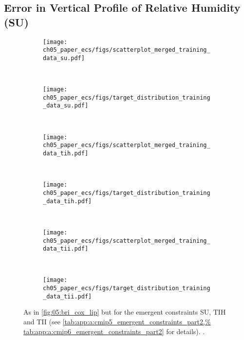 \subsection{Error in Vertical Profile of Relative Humidity (SU)}
\label{subsec:05:su}

\begin{figure}[!t]
  \centering
  \begin{subfigure}[b]{\SubfigureWidth{}}
    \texttt{[image: 
      ch05\_paper\_ecs/figs/scatterplot\_merged\_training\_data\_su.pdf]}
    \caption{}
    \label{fig:05:su_tih_tii:a}
  \end{subfigure}
  ~
  \begin{subfigure}[b]{\SubfigureWidth{}}
    \texttt{[image: 
      ch05\_paper\_ecs/figs/target\_distribution\_training\_data\_su.pdf]}
    \caption{}
    \label{fig:05:su_tih_tii:b}
  \end{subfigure}
  \\
  \begin{subfigure}[b]{\SubfigureWidth{}}
    \texttt{[image: 
      ch05\_paper\_ecs/figs/scatterplot\_merged\_training\_data\_tih.pdf]}
    \caption{}
    \label{fig:05:su_tih_tii:c}
  \end{subfigure}
  ~
  \begin{subfigure}[b]{\SubfigureWidth{}}
    \texttt{[image: 
      ch05\_paper\_ecs/figs/target\_distribution\_training\_data\_tih.pdf]}
    \caption{}
    \label{fig:05:su_tih_tii:d}
  \end{subfigure}
  \\
  \begin{subfigure}[b]{\SubfigureWidth{}}
    \texttt{[image: 
      ch05\_paper\_ecs/figs/scatterplot\_merged\_training\_data\_tii.pdf]}
    \caption{}
    \label{fig:05:su_tih_tii:e}
  \end{subfigure}
  ~
  \begin{subfigure}[b]{\SubfigureWidth{}}
    \texttt{[image: 
      ch05\_paper\_ecs/figs/target\_distribution\_training\_data\_tii.pdf]}
    \caption{}
    \label{fig:05:su_tih_tii:f}
  \end{subfigure}
  \caption{As in \cref{fig:05:bri_cox_lip} but for the emergent constraints SU,
    TIH and TII (see \cref{tab:app:a:cmip5_emergent_constraints_part2,%
      tab:app:a:cmip6_emergent_constraints_part2} for details).
    .}
  \label{fig:05:su_tih_tii}
\end{figure}

